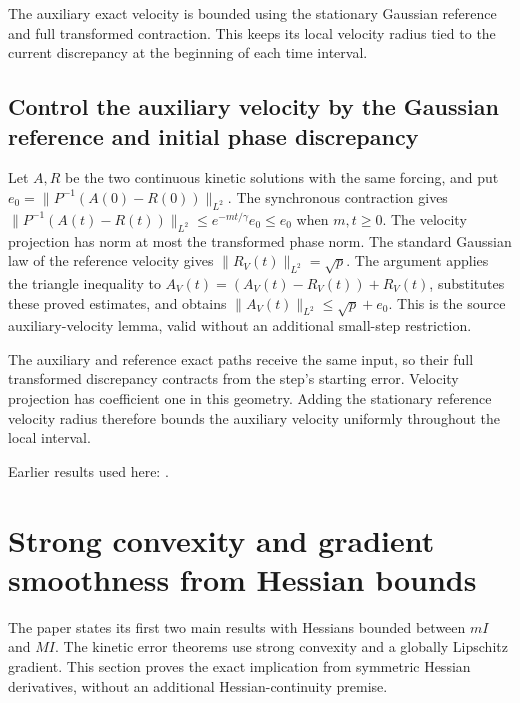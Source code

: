 \documentclass[11pt,a4paper]{report}
\begin{document}
The auxiliary exact velocity is bounded using the stationary Gaussian reference and full transformed contraction. This keeps its local velocity radius tied to the current discrepancy at the beginning of each time interval.

\subsection{\texorpdfstring{Control the auxiliary velocity by the Gaussian reference and initial phase discrepancy}{Control the auxiliary velocity by the Gaussian reference and initial phase discrepancy}}
\label{report-step-KineticLangevin-AuxiliaryVelocity-lean-1}


Let \(A,R\) be the two continuous kinetic solutions with the same forcing, and put \(e_0=\|P^{-1}(A(0)-R(0))\|_{L^2}\). The synchronous contraction gives \(\|P^{-1}(A(t)-R(t))\|_{L^2}\le e^{-mt/\gamma}e_0\le e_0\) when \(m,t\ge0\). The velocity projection has norm at most the transformed phase norm. The standard Gaussian law of the reference velocity gives \(\|R_V(t)\|_{L^2}=\sqrt p\). The argument applies the triangle inequality to \(A_V(t)=(A_V(t)-R_V(t))+R_V(t)\), substitutes these proved estimates, and obtains \(\|A_V(t)\|_{L^2}\le\sqrt p+e_0\). This is the source auxiliary-velocity lemma, valid without an additional small-step restriction.



The auxiliary and reference exact paths receive the same input, so their full transformed discrepancy contracts from the step’s starting error. Velocity projection has coefficient one in this geometry. Adding the stationary reference velocity radius therefore bounds the auxiliary velocity uniformly throughout the local interval.



Earlier results used here: \cite[Section~3.13.2]{LangevinLean2026ULASC}.
\section{\texorpdfstring{Strong convexity and gradient smoothness from Hessian bounds}{Strong convexity and gradient smoothness from Hessian bounds}}
\label{proof-module-KineticLangevin-HessianAssumptions-lean}


The paper states its first two main results with Hessians bounded between \(mI\) and \(MI\). The kinetic error theorems use strong convexity and a globally Lipschitz gradient. This section proves the exact implication from symmetric Hessian derivatives, without an additional Hessian-continuity premise.
\end{document}
